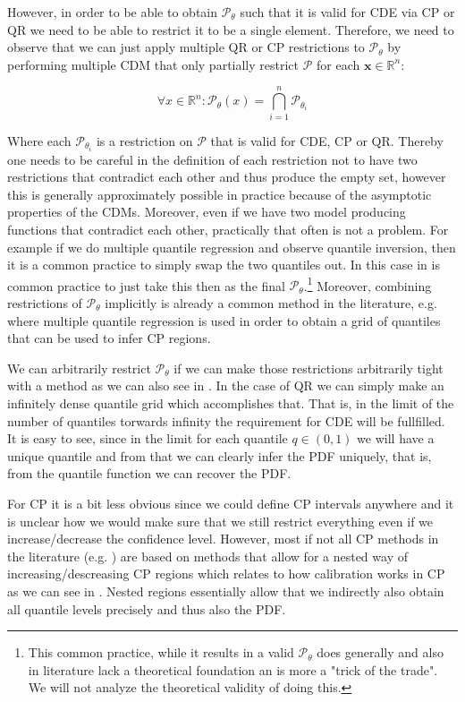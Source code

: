However, in order to be able to obtain $\mathscr{P}_\theta$ such that it is valid for CDE via CP or QR we need to be able to restrict it to be a single element. Therefore, we need to observe that we can just apply multiple QR or CP restrictions to $\mathscr{P}_\theta$ by performing multiple CDM that only partially restrict $\mathcal{P}$ for each $\mathbf{x}\in\mathbb{R}^n$:

\begin{equation}
    \forall x\in\mathbb{R}^n: \mathscr{P}_{\theta}(x) = \bigcap_{i=1}^n \mathscr{P}_{\theta_i}
\end{equation}

Where each $\mathscr{P}_{\theta_i}$ is a restriction on $\mathcal{P}$ that is valid for CDE, CP or QR. Thereby one needs to be careful in the definition of each restriction not to have two restrictions that contradict each other and thus produce the empty set, however this is generally approximately possible in practice because of the asymptotic properties of the CDMs. Moreover, even if we have two model producing functions that contradict each other, practically that often is not a problem. For example if we do multiple quantile regression and observe quantile inversion, then it is a common practice to simply swap the two quantiles out. In this case in is common practice to just take this then as the final $\mathcal{P}_{\theta}$.\footnote{This common practice, while it results in a valid $\mathcal{P}_{\theta}$ does generally and also in literature lack a theoretical foundation an is more a "trick of the trade". We will not analyze the theoretical validity of doing this.} Moreover, combining restrictions of $\mathcal{P}_\theta$ implicitly is already a common method in the literature, e.g. \cite{sesia2021conformal} where multiple quantile regression is used in order to obtain a grid of quantiles that can be used to infer CP regions.

We can arbitrarily restrict $\mathcal{P}_\theta$ if we can make those restrictions arbitrarily tight with a method as we can also see in . In the case of QR we can simply make an infinitely dense quantile grid which accomplishes that. That is, in the limit of the number of quantiles torwards infinity the requirement for CDE will be fullfilled. It is easy to see, since in the limit for each quantile $q\in(0,1)$ we will have a unique quantile and from that we can clearly infer the PDF uniquely, that is, from the quantile function we can recover the PDF.

For CP it is a bit less obvious since we could define CP intervals anywhere and it is unclear how we would make sure that we still restrict everything even if we increase/decrease the confidence level. However, most if not all CP methods in the literature (e.g. \cite{sesia2021conformal, chernozhukov2021distributional}) are based on methods that allow for a nested way of increasing/descreasing CP regions which relates to how calibration works in CP as we can see in . Nested regions essentially allow that we indirectly also obtain all quantile levels precisely and thus also the PDF.

